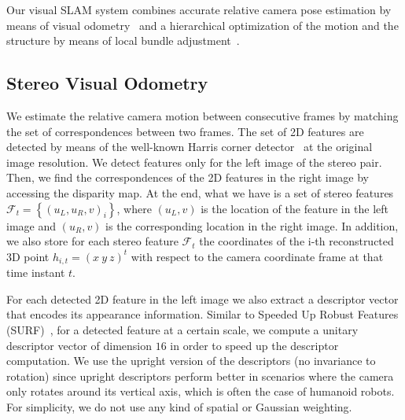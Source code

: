 \documentclass[conference]{IEEEtran}
\begin{document}
Our visual SLAM system combines accurate relative camera pose estimation by means of visual odometry~\cite{Kaess09icra} and a hierarchical optimization of the motion and the structure by means of local bundle adjustment~\cite{Mouragnon09ivc}. 

\subsection{Stereo Visual Odometry}\label{sec:visual_odometry}
We estimate the relative camera motion between consecutive frames by matching the set of correspondences between two frames. The set of 2D features are detected by means of the well-known Harris corner detector~\cite{Harris88avc} at the original image resolution. We detect features only for the left image of the stereo pair. Then, we find the correspondences of the 2D features in the right image by accessing the disparity map. At the end, what we have is a set of stereo features $\mathcal{F}_{t}=\left\{\left(u_{L},u_{R},v\right)_{i}\right\}$, where
$\left(u_{L},v\right)$ is the location of the feature in the left image and $\left(u_{R},v\right)$ is the corresponding location in the right image. In addition, we also store for each stereo feature $\mathcal{F}_{t}$ the coordinates of the i-th reconstructed 3D point $h_{i,t}=\left(x \ y \ z\right)^{t}$ with respect to the camera coordinate frame at that time instant $t$. 

For each detected 2D feature in the left image we also extract a descriptor vector that encodes its appearance information. Similar to Speeded Up Robust Features (SURF)~\cite{Bay08cviu}, for a detected feature at a certain scale, we compute a unitary descriptor vector of dimension $16$ in order to speed up the descriptor computation. We use the upright version of the descriptors (no invariance to rotation) since upright descriptors perform better in scenarios where the camera only rotates around its vertical axis, which is often the case of humanoid robots. For simplicity, we do not use any kind of spatial or Gaussian weighting. 
\end{document}
